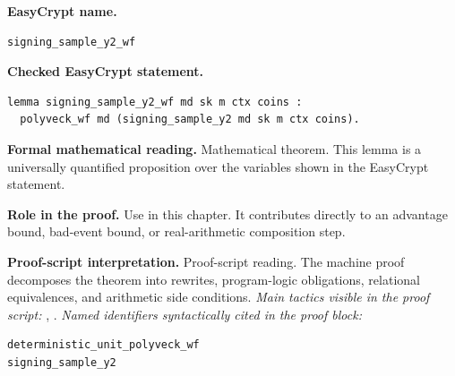 \begin{formaltheorem}
\noindent\textbf{EasyCrypt name.}
\begin{lstlisting}[language=EasyCrypt,basicstyle=\ttfamily\scriptsize]
signing_sample_y2_wf
\end{lstlisting}
\noindent\textbf{Checked EasyCrypt statement.}
\begin{lstlisting}[language=EasyCrypt,basicstyle=\ttfamily\scriptsize]
lemma signing_sample_y2_wf md sk m ctx coins :
  polyveck_wf md (signing_sample_y2 md sk m ctx coins).
\end{lstlisting}
\noindent\textbf{Formal mathematical reading.}
Mathematical theorem. This lemma is a universally quantified proposition over the variables shown in the EasyCrypt statement.

\noindent\textbf{Role in the proof.}
Use in this chapter. It contributes directly to an advantage bound, bad-event bound, or real-arithmetic composition step.

\noindent\textbf{Proof-script interpretation.}
Proof-script reading. The machine proof decomposes the theorem into rewrites, program-logic obligations, relational equivalences, and arithmetic side conditions.
\emph{Main tactics visible in the proof script:} , .
\emph{Named identifiers syntactically cited in the proof block:}
\begin{lstlisting}[language=EasyCrypt,basicstyle=\ttfamily\scriptsize]
deterministic_unit_polyveck_wf
signing_sample_y2
\end{lstlisting}

\end{formaltheorem}

